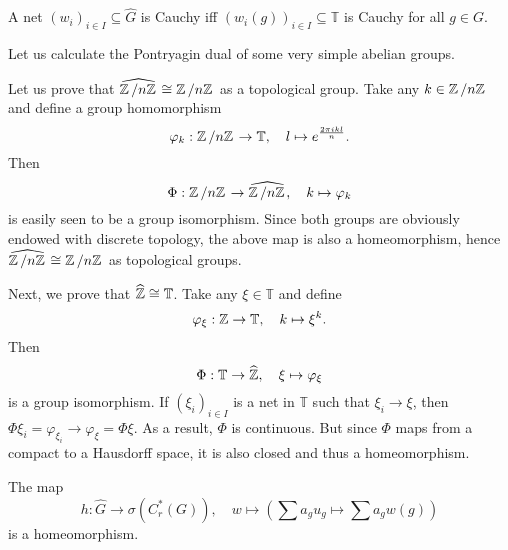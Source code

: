 \begin{remark}
  A net $(w_i)_{i \in I} \subseteq \widehat{G}$ is Cauchy iff 
$(w_i (g))_{i \in I} \subseteq \mathbb{T}$ is Cauchy for all $g \in G$.
\end{remark}


Let us calculate the Pontryagin dual of some very simple abelian groups.

\begin{example}
  Let us prove that $\widehat{\quot{\Z}{n\Z}} \cong \quot{\Z}{n\Z}$ as a topological group.
  Take any $k \in \quot{\Z}{n\Z}$ and define a group homomorphism 
  $$\varphi_k : \quot{\Z}{n\Z} \to \mathbb{T},\quad l \mapsto e^{\frac{2\pi ikl}{n}}.$$
  Then $$\Phi: \quot{\Z}{n\Z} \to \widehat{\quot{\Z}{n\Z}},\quad k \mapsto \varphi_k$$
  is easily seen to be a group isomorphism. Since both groups are obviously endowed with discrete topology,
  the above map is also a homeomorphism, hence $\widehat{\quot{\Z}{n\Z}} \cong \quot{\Z}{n\Z}$ as topological groups.
\end{example}

\begin{example}
  Next, we prove that $\widehat{\mathbb {Z}} \cong \mathbb{T}$. Take any $\xi \in \mathbb{T}$ and define 
  $$\varphi_{\xi}: \mathbb {Z} \to \mathbb{T},\quad k \mapsto \xi^k.$$ 
  Then $$\Phi: \mathbb{T}\to \widehat{\mathbb {Z}},\quad \xi \mapsto \varphi_{\xi}$$
  is a group isomorphism. If $(\xi_i)_{i \in I}$ is a net in $\mathbb{T}$ such that $\xi_i \to \xi$,
  then $\Phi \xi_i = \varphi_{\xi_i} \to \varphi_{\xi} = \Phi \xi$. As a result, $\Phi$ is continuous.
  But since $\Phi$ maps from a compact to a Hausdorff space, it is also closed and thus a homeomorphism.
\end{example}


\begin{theorem}
  The map 
  $$h: \widehat{G} \to \sigma(C_r ^* (G)),\quad w \mapsto \left(\sum a_g u_g \mapsto \sum a_g w(g)\right)$$
  is a homeomorphism.
\end{theorem}

